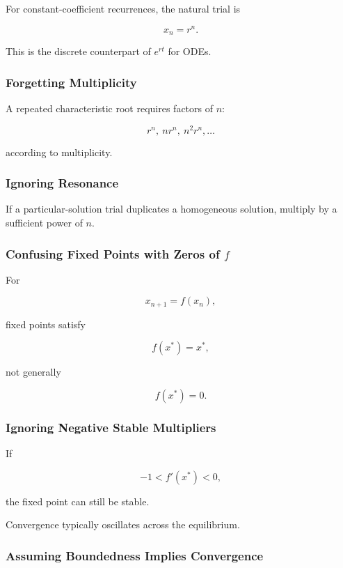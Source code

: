 For constant-coefficient recurrences, the natural trial is

\[
\boxed{
x_n=r^n.
}
\]

This is the discrete counterpart of \(e^{rt}\) for ODEs.

\subsubsection{Forgetting Multiplicity}

A repeated characteristic root requires factors of \(n\):

\[
\boxed{
r^n,
\ nr^n,
\ n^2r^n,
\ldots
}
\]

according to multiplicity.

\subsubsection{Ignoring Resonance}

If a particular-solution trial duplicates a homogeneous solution, multiply
by a sufficient power of \(n\).

\subsubsection{Confusing Fixed Points with Zeros of \(f\)}

For

\[
x_{n+1}=f(x_n),
\]

fixed points satisfy

\[
\boxed{
f(x^*)=x^*,
}
\]

not generally

\[
f(x^*)=0.
\]

\subsubsection{Ignoring Negative Stable Multipliers}

If

\[
-1<f'(x^*)<0,
\]

the fixed point can still be stable.

Convergence typically oscillates across the equilibrium.

\subsubsection{Assuming Boundedness Implies Convergence}

